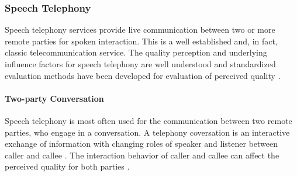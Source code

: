 \subsubsection*{Speech Telephony}\label{method:sct}
Speech telephony services provide live communication between two or more remote parties for spoken interaction.
This is a well established and, in fact, classic telecommunication service.
The quality perception and underlying influence factors for speech telephony are well understood and standardized evaluation methods have been developed for evaluation of perceived quality \citep[\eg,][]{itu_handbook_1992}.

\paragraph*{Two-party Conversation}
Speech telephony is most often used for the communication between two remote parties, who engage in a conversation.
A telephony coversation is an interactive exchange of information with changing roles of speaker and listener between caller and callee \citep[][]{hopper_telephone_1992}.
The interaction behavior of caller and callee can affect the perceived quality for both parties \citep[\eg,][]{schoenenberg_why_2014, egger_it_2010}.

